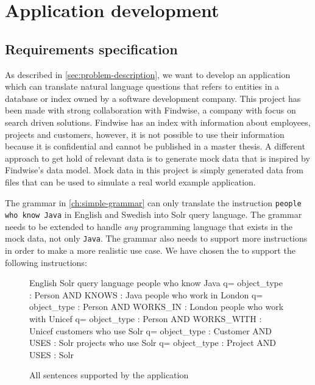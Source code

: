 \chapter{Application development}\label{ch:application-overview}

\section{Requirements specification}

As described in \autoref{sec:problem-description}, we want to develop an application which can translate natural language questions that refers to entities in a database or index owned by a software development company. This project has been made with strong collaboration with Findwise, a company with focus on search driven solutions. Findwise has an index with information about employees, projects and customers, however, it is not possible to use their information because it is confidential and cannot be published in a master thesis. A different approach to get hold of relevant data is to generate mock data that is inspired by Findwise's data model. Mock data in this project is simply generated data from files that can be used to simulate a real world example application.

\label{sec:grammar-development}
The grammar in \autoref{ch:simple-grammar} can only translate the instruction \texttt{people who know Java} in English and Swedish into Solr query language. The grammar needs to be extended to handle \emph{any} programming language that exists in the mock data, not only \texttt{Java}. The grammar also needs to support more instructions in order to make a more realistic use case. We have chosen the to support the following instructions:

\begin{figure}[H]
\begin{terminal}
English                        Solr query language
people who know Java           q= object_type : Person AND KNOWS : Java
people who work in London      q= object_type : Person AND WORKS_IN : London
people who work with Unicef    q= object_type : Person AND WORKS_WITH : Unicef
customers who use Solr         q= object_type : Customer AND USES : Solr
projects who use Solr          q= object_type : Project AND USES : Solr
\end{terminal}
\caption{All sentences supported by the application\label{fig:suppported-sentences}}
\end{figure}

